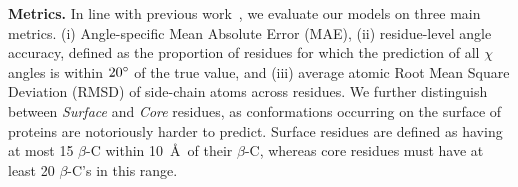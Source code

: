 \textbf{Metrics.} In line with previous work~\citep{mcpartlon_end--end_2023, zhang_diffpack_2023},
we evaluate our models on three main metrics. (i) Angle-specific Mean Absolute Error (MAE), (ii)
residue-level angle accuracy, defined as the proportion of residues for which the prediction of all
$\chi$ angles is within $20\degree$ of the true value, and (iii) average atomic Root Mean Square
Deviation (RMSD) of side-chain atoms across residues. We further distinguish between
\textit{Surface} and  \textit{Core} residues, as conformations occurring on the surface of proteins
are notoriously harder to predict. Surface residues are defined as having at most 15 $\beta$-C
within 10~\AA\, of their $\beta$-C, whereas core residues must have at least 20 $\beta$-C's in this
range.


\begin{table}[t]
    \begin{center}
\end{center}
\end{table}
